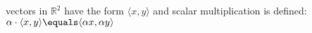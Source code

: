 \documentclass[preview]{standalone}
\begin{document}
\begin{center}
vectors in $\mathbb{R}^2$ have the form $\langle x, y\rangle$ and scalar multiplication is defined: $\alpha \cdot \langle x, y\rangle \equals \langle \alpha x, \alpha y \rangle$
\end{center}
\end{document}
